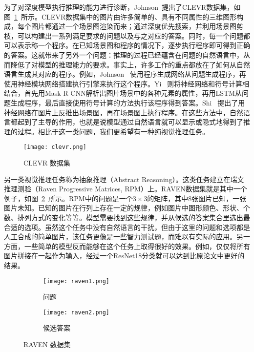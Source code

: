 为了对深度模型执行推理的能力进行诊断，Johnson~\etal 提出了CLEVR数据集\cite{johnson2017clevr}，如图~\ref{fig:clevr}~所示。CLEVR数据集中的图片由许多简单的、具有不同属性的三维图形构成，每个图片都通过一个场景图渲染而来；通过深度优先搜索，并利用场景图剪枝，可以构建出一系列满足要求的问题以及与之对应的答案。同时，每一个问题都可以表示称一个程序。在已知场景图和程序的情况下，逐步执行程序即可得到正确的答案。这就带来了另外一个问题：推理的过程已经蕴含在问题的自然语言中，从而降低了对模型的推理能力的要求。事实上，许多工作的重点都放在了如何从自然语言生成其对应的程序。例如，Johnson~\etal\cite{Johnson_2017_ICCV} 使用程序生成网络从问题生成程序，再使用神经模块网络\cite{andreas2016neural}搭建执行引擎来执行这个程序。Yi~\etal\cite{yi2018neural} 则将神经网络和符号计算相结合，首先用Mask R-CNN\cite{he2017mask}解析出图片场景中的各种元素的属性，再用LSTM\cite{hochreiter1997long}从问题生成程序，最后直接使用符号计算的方法执行该程序得到答案。Shi~\etal\cite{shi2019explainable} 提出了用神经网络在图片上反推出场景图，再在场景图上执行程序。在这些方法中，自然语言都起到了主导的作用，也就是说模型通过自然语言就可以显示或隐式地得到了推理的过程。相比于这一类问题，我们更希望有一种纯视觉推理任务。

\begin{figure}
    \centering
    \texttt{[image: clevr.png]}
    \caption{CLEVR 数据集\cite{johnson2017clevr}}
    \label{fig:clevr}
\end{figure}

另一类视觉推理任务称为抽象推理（Abstract Reasoning）\cite{barrett2018measuring,zhang2019raven}。这类任务建立在瑞文推理测验（Raven Progressive Matrices, RPM）上。RAVEN数据集\cite{zhang2019raven}就是其中一个例子，如图~\ref{fig:raven}~所示。RPM中的问题是一个$3\times 3$的矩阵，其中8张图片已知，一张图片未知。已知的图片在行列上存在一定的规律，例如图片中图形颜色、形状、个数、排列方式的变化等等。模型需要找到这些规律，并从候选的答案集合里选出最合适的选项。虽然这个任务中没有自然语言的干扰，但由于这里的问题和选项都是人工合成的简单图片，该任务更像是一些智力测试题，而难以有实际的应用。另一方面，一些简单的模型反而能够在这个任务上取得很好的效果。例如，仅仅将所有图片拼接在一起作为输入，经过一个ResNet18\cite{he2016deep}分类就可以达到比原论文\cite{zhang2019raven}中更好的结果。

\begin{figure}
    \centering
    \begin{subfigure}{.35\textwidth}
        \texttt{[image: raven1.png]}
        \caption{问题}
    \end{subfigure}\hfill
    \begin{subfigure}{.55\textwidth}
        \texttt{[image: raven2.png]}
        \caption{候选答案}
    \end{subfigure}
    \caption{RAVEN 数据集}
    \label{fig:raven}
\end{figure}

